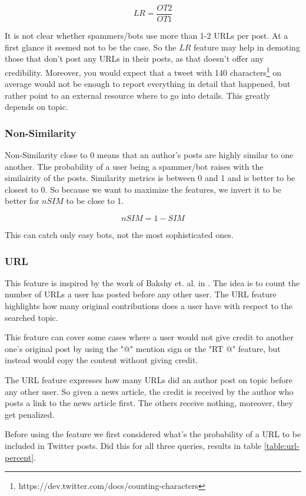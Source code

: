 $$LR = \frac{OT2}{OT1}$$

It is not clear whether spammers/bots use more than 1-2 URLs per post. At a first glance it seemed not to be the case. So the $LR$ feature may help in demoting those that don't post any URLs in their posts, as that doesn't offer any credibility. Moreover, you would expect that a tweet with 140 characters\footnote{\label{fn:twitter-140}https://dev.twitter.com/docs/counting-characters} on average would not be enough to report everything in detail that happened, but rather point to an external resource where to go into details. This greatly depends on topic.

\subsubsection{Non-Similarity}

Non-Similarity close to 0 means that an author's posts are highly similar to one another. The probability of a user being a spammer/bot raises with the similairity of the posts.
Similarity metrics is between 0 and 1 and is better to be closest to 0. So because we want to maximize the features, we invert it to be better for $nSIM$ to be close to 1.

$$nSIM = 1 - SIM$$

This can catch only easy bots, not the most sophisticated ones.

\subsubsection{URL}
\label{subsec:URL}

This feature is inspired by the work of Bakshy et. al. in \cite{bakshy}. The idea is to count the number of URLs a user has posted before any other user. The URL feature highlights how many original contributions does a user have with respect to the searched topic.

This feature can cover some cases where a user would not give credit to another one's original post by using the "@" mention sign or the "RT @" feature, but instead would copy the content without giving credit.

The URL feature expresses how many URLs did an author post on topic before any other user. So given a news article, the credit is received by the author who posts a link to the news article first. The others receive nothing, moreover, they get penalized.

Before using the feature we first considered what's the probability of a URL to be included in Twitter posts. Did this for all three queries, results in table \ref{table:url-percent}.


